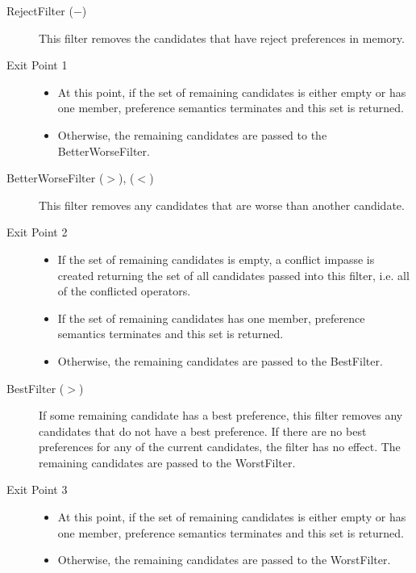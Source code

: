 \begin{description}
\item[RejectFilter ($-$) ] This filter removes the candidates that have
	reject preferences in memory. 
\index{-}

\item[Exit Point 1]
	\begin{itemize}
	\item At this point, if the set of remaining candidates is either empty or has one
	member, preference semantics terminates and this set is returned.
	\item Otherwise, the remaining candidates are passed to the
	BetterWorseFilter.
	\end{itemize}
\index{-}

\item[BetterWorseFilter ($>$), ($<$) ] This filter removes any candidates that are worse
	than another candidate.
\index{<}
\index{>}

\item[Exit Point 2]
	\begin{itemize}
	\item If the set of remaining candidates is empty, a conflict impasse is created
	returning the set of all candidates passed into this filter, i.e. all of the
	conflicted operators.
	\item If the set of remaining candidates has one
	member, preference semantics terminates and this set is returned.
	\item Otherwise, the remaining candidates are passed to the
	BestFilter.
	\end{itemize}
\index{-}

\item[BestFilter ($>$) ] If some remaining candidate has a best preference,
	this filter removes any candidates that do not have
	a best preference. If there are no best preferences for any of the current
	candidates, the filter has no effect. The remaining candidates are passed
	to the WorstFilter.

\item[Exit Point 3]
	\begin{itemize}
	\item At this point, if the set of remaining candidates is either empty or has one
	member, preference semantics terminates and this set is returned.
	\item Otherwise, the remaining candidates are passed to the
	WorstFilter.
	\end{itemize}
\index{-}


\end{description}
